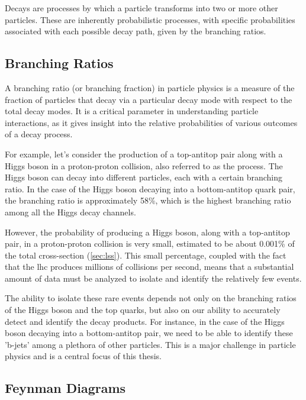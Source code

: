 Decays are processes by which a particle transforms into two or more other particles. These are inherently probabilistic
processes, with specific probabilities associated with each possible decay path, given by the branching ratios.


\subsection{Branching Ratios}

A branching ratio (or branching fraction) in particle physics is a measure of the fraction of particles that decay via a
particular decay mode with respect to the total decay modes. It is a critical parameter in understanding particle
interactions, as it gives insight into the relative probabilities of various outcomes of a decay process.

For example, let's consider the production of a top-antitop pair along with a Higgs boson in a proton-proton collision,
also referred to as the \tth process. The Higgs boson can decay into different particles, each with a certain branching
ratio. In the case of the Higgs boson decaying into a bottom-antitop quark pair, the branching ratio is approximately
58\%, which is the highest branching ratio among all the Higgs decay channels.

However, the probability of producing a Higgs boson, along with a top-antitop pair, in a proton-proton collision is very
small, estimated to be about 0.001\% of the total cross-section (\autoref{sec:lss}). This small percentage, coupled with
the fact that the \gls{lhc} produces millions of collisions per second, means that a substantial amount of data must be
analyzed to isolate and identify the relatively few \tth events.

The ability to isolate these rare events depends not only on the branching ratios of the Higgs boson and the top quarks,
but also on our ability to accurately detect and identify the decay products. For instance, in the case of the Higgs
boson decaying into a bottom-antitop pair, we need to be able to identify these 'b-jets' among a plethora of other
particles. This is a major challenge in particle physics and is a central focus of this thesis.

\subsection{Feynman Diagrams}



